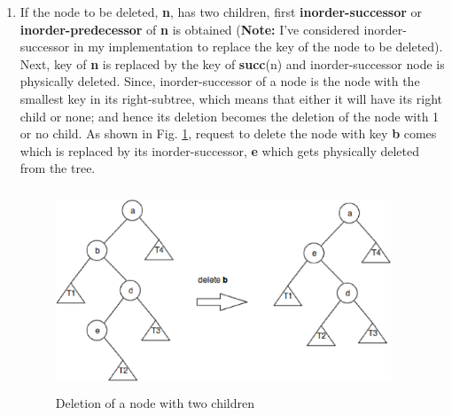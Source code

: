 \documentclass[MTech]{iitmdiss}
\begin{document}
\begin{enumerate}
\item If the node to be deleted, \textbf{n}, has two children, first \textbf{inorder-successor} or \textbf{inorder-predecessor} of \textbf{n} is obtained (\textbf{Note:} I've considered inorder-successor in my implementation to replace the key of the node to be deleted). Next, key of \textbf{n} is replaced by the key of \textbf{succ}(n) and inorder-successor node is physically deleted. Since, inorder-successor of a node is the node with the smallest key in its right-subtree, which means that either it will have its right child or none; and hence its deletion becomes the deletion of the node with 1 or no child. As shown in Fig. \ref{fig:two_child_delete}, request to delete the node with key \textbf{b} comes which is replaced by its inorder-successor, \textbf{e} which gets physically deleted from the tree. 

\begin{figure}
\centering 
\includegraphics[width=10cm,height=6cm]{two_child_delete}
\caption{Deletion of a node with two children}
\label{fig:two_child_delete}
\end{figure}
\end{enumerate}
\end{document}
